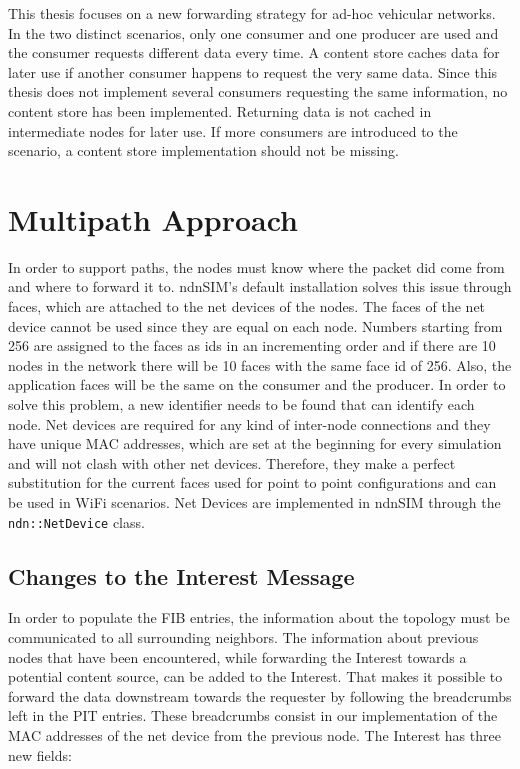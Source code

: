 This thesis focuses on a new forwarding strategy for ad-hoc vehicular networks. In the two distinct scenarios, only one consumer and one producer are used and the consumer requests different data every time. A content store caches data for later use if another consumer happens to request the very same data. Since this thesis does not implement several consumers requesting the same information, no content store has been implemented. Returning data is not cached in intermediate nodes for later use. If more consumers are introduced to the scenario, a content store implementation should not be missing.


\section{Multipath Approach}

In order to support paths, the nodes must know where the packet did come from and where to forward it to. ndnSIM's default installation solves this issue through faces, which are attached to the net devices of the nodes. The faces of the net device cannot be used since they are equal on each node. Numbers starting from 256 are assigned to the faces as ids in an incrementing order and if there are 10 nodes in the network there will be 10 faces with the same face id of 256. Also, the application faces will be the same on the consumer and the producer. In order to solve this problem, a new identifier needs to be found that can identify each node. Net devices are required for any kind of inter-node connections and they have unique MAC addresses, which are set at the beginning for every simulation and will not clash with other net devices. Therefore, they make a perfect substitution for the current faces used for point to point configurations and can be used in WiFi scenarios. Net Devices are implemented in ndnSIM through the \texttt{ndn::NetDevice} class.

\subsection{Changes to the Interest Message}

In order to populate the FIB entries, the information about the topology must be communicated to all surrounding neighbors. The information about previous nodes that have been encountered, while forwarding the Interest towards a potential content source, can be added to the Interest. That makes it possible to forward the data downstream towards the requester by following the breadcrumbs left in the PIT entries. These breadcrumbs consist in our implementation of the MAC addresses of the net device from the previous node. The Interest has three new fields:

